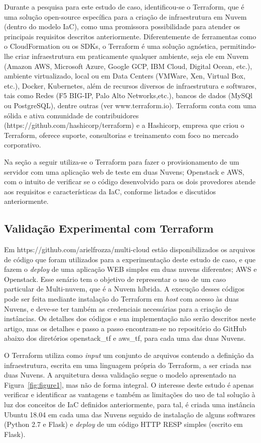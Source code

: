 \documentclass[12pt]{article}
\begin{document}
	Durante a pesquisa para este estudo de caso, identificou-se o Terraform, que é uma solução open-source específica para a criação de infraestrutura em Nuvem (dentro do modelo IaC), como uma promissora possibilidade para atender os principais requisitos descritos anteriormente. Diferentemente de ferramentas como o CloudFormation ou os SDKs, o Terraform é uma solução agnóstica, permitindo-lhe criar infraestrutura em praticamente qualquer ambiente, seja ele em Nuvem (Amazon AWS, Microsoft Azure, Google GCP, IBM Cloud, Digital Ocean, etc.), ambiente virtualizado, local ou em Data Centers (VMWare, Xen, Virtual Box, etc.), Docker, Kubernetes, além de recursos diversos de infraestrutura e softwares, tais como Redes (F5 BIG-IP, Palo Alto Networks,etc.), bancos de dados (MySQl ou PostgreSQL), dentre outras (ver www.terraform.io). Terraform conta com uma sólida e ativa comunidade de contribuidores (https://github.com/hashicorp/terraform) e a Hashicorp, empresa que criou o Terraform, oferece suporte, consultorias e treinamento com foco no mercado corporativo.
	
	Na seção a seguir utiliza-se o Terraform para fazer o provisionamento de um servidor com uma aplicação web de teste em duas Nuvens; Openstack e AWS, com o intuito de verificar se o código desenvolvido para os dois provedores atende aos requisitos e características da IaC, conforme listados e discutidos anteriormente.  
	
	\subsection{Validação Experimental com Terraform}
		
	Em https://github.com/arielfrozza/multi-cloud estão disponibilizados os arquivos de código que foram utilizados para a experimentação deste estudo de caso, e que fazem o \textit{deploy} de uma aplicação WEB simples em duas nuvens diferentes; AWS e Openstack. Esse senário tem o objetivo de representar o uso de um caso particular de Multi-nuvem, que é a Nuvem híbrida. A execução desses códigos pode ser feita mediante instalação do Terraform em \textit{host} com acesso às duas Nuvens, e deve-se ter também as credenciais necessárias para a criação de instâncias. Os detalhes dos códigos e sua implementação não serão descritos neste artigo, mas os detalhes e passo a passo encontram-se no repositório do GitHub abaixo dos diretórios openstack\_tf e aws\_tf, para cada uma das duas Nuvens.
	
	O Terraform utiliza como \textit{input} um conjunto de arquivos contendo a definição da infraestrutura, escrita em uma linguagem própria do Terraform, a ser criada nas duas Nuvens. A arquitetura dessa validação segue o modelo apresentado na Figura~\ref{fig:figure1}, mas não de forma integral. O interesse deste estudo é apenas verificar e identificar as vantagens e também as limitações do uso de tal solução à luz dos conceitos de IaC definidos anteriormente, para tal, é criada uma instância Ubuntu 18.04 em cada uma das Nuvens seguido de instalação de alguns softwares (Python 2.7 e Flask) e \textit{deploy} de um código HTTP RESP simples (escrito em Flask).
	
\end{document}
